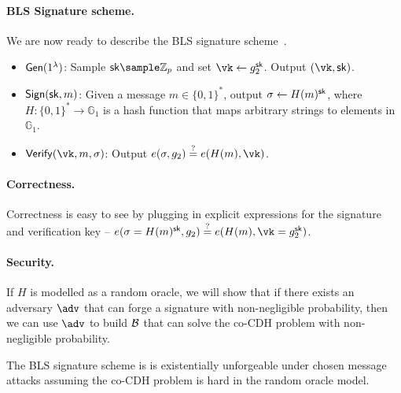 \paragraph{BLS Signature scheme.} We are now ready to describe the BLS signature scheme~\cite{AC:BonLynSha01}.
\begin{itemize}
    \item $\mathsf{Gen}(1^\lambda)$: Sample $\sk \sample \mathbb{Z}_p$ and set $\vk \gets g_2^\sk$. Output $(\vk, \sk)$.
    \item $\mathsf{Sign}(\mathsf{sk}, m)$: Given a message $m \in \{0,1\}^*$, output $\sigma \gets H(m)^{\mathsf{sk}}$, where $H: \{0,1\}^* \to \mathbb{G}_1$ is a hash function that maps arbitrary strings to elements in $\mathbb{G}_1$.
    \item $\Verify(\vk, m, \sigma)$: Output $e(\sigma, g_2) \stackrel{?}{=} e(H(m), \vk)$.
\end{itemize}

\paragraph{Correctness.} Correctness is easy to see by plugging in explicit expressions for the signature and verification key -- $e(\sigma=H(m)^\sk, g_2) \stackrel{?}{=} e(H(m), \vk=g_2^\sk)$.

\paragraph{Security.} If $H$ is modelled as a random oracle, we will show that if there exists an adversary $\adv$ that can forge a signature with non-negligible probability, then we can use $\adv$ to build $\mathcal{B}$ that can solve the co-CDH problem with non-negligible probability.

\begin{theorem}
    The BLS signature scheme is is existentially unforgeable under chosen message attacks assuming the co-CDH problem is hard in the random oracle model.
\end{theorem}

